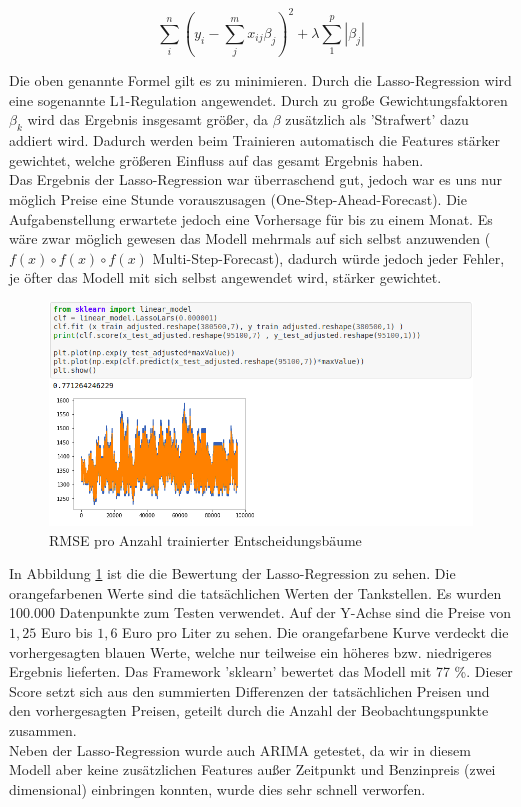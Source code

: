 \documentclass[
ngerman          %
,a4paper          %
,11pt
,pdftex
]{report}
\begin{document}
$$ \sum_{i}^{n}(y_i - \sum_{j}^{m} x_{ij}\beta_j)^2 + \lambda \sum_{1}^{p} |\beta_j| $$

Die oben genannte Formel gilt es zu minimieren.
Durch die Lasso-Regression wird eine sogenannte L1-Regulation angewendet. Durch zu große Gewichtungsfaktoren $\beta_k$ wird das Ergebnis insgesamt größer, da $\beta$ zusätzlich als 'Strafwert' dazu addiert wird. Dadurch werden beim Trainieren automatisch die Features stärker gewichtet, welche größeren Einfluss auf das gesamt Ergebnis haben.\\
Das Ergebnis der Lasso-Regression war überraschend gut, jedoch war es uns nur möglich Preise eine Stunde vorauszusagen (One-Step-Ahead-Forecast). Die Aufgabenstellung erwartete jedoch eine Vorhersage für bis zu einem Monat. Es wäre zwar möglich gewesen das Modell mehrmals auf sich selbst anzuwenden ( $f(x) \circ f(x) \circ f(x) $ Multi-Step-Forecast), dadurch würde jedoch jeder Fehler, je öfter das Modell mit sich selbst angewendet wird, stärker gewichtet.\\
\begin{figure}
	\centering
	\includegraphics[width=0.7\linewidth]{images/fehlversuch}
	\caption{RMSE pro Anzahl trainierter Entscheidungsbäume}
	\label{fig:fehlversuch}
\end{figure}
In Abbildung \ref{fig:fehlversuch} ist die die Bewertung der Lasso-Regression zu sehen. Die orangefarbenen Werte sind die tatsächlichen Werten der Tankstellen. Es wurden 100.000 Datenpunkte zum Testen verwendet. Auf der Y-Achse sind die Preise von $1,25$ Euro bis $1,6$ Euro pro Liter zu sehen. Die orangefarbene Kurve verdeckt die vorhergesagten blauen Werte, welche nur teilweise ein höheres bzw. niedrigeres Ergebnis lieferten. Das Framework 'sklearn' bewertet das Modell mit 77 \%.
Dieser Score setzt sich aus den summierten Differenzen der tatsächlichen Preisen und den vorhergesagten Preisen, geteilt durch die Anzahl der Beobachtungspunkte zusammen.\\

Neben der Lasso-Regression wurde auch ARIMA getestet, da wir in diesem Modell aber keine zusätzlichen Features außer Zeitpunkt und Benzinpreis (zwei dimensional) einbringen konnten, wurde dies sehr schnell verworfen.
\end{document}
